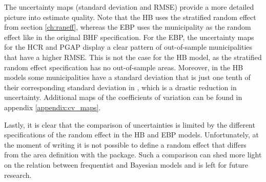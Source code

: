 The uncertainty maps (standard deviation and RMSE) provide a more detailed picture into estimate quality.
Note that the HB uses the stratified random effect from section \ref{ch:raneff}, whereas the EBP uses the municipality as the random effect like in the original BHF specification.
For the EBP, the uncertainty maps for the HCR and PGAP display a clear pattern of out-of-sample municipalities that have a higher RMSE.
This is not the case for the HB model, as the stratified random effect specification has no out-of-sample areas.
Moreover, in the HB models some municipalities have a standard deviation that is just one tenth of their corresponding standard deviation in \citep{morelli_hierarchical_2021}, which is a drastic reduction in uncertainty.
Additional maps of the coefficients of variation can be found in appendix \ref{appendix:cv_maps}.

Lastly, it is clear that the comparison of uncertainties is limited by the different specifications of the random effect in the HB and EBP models.
Unfortunately, at the moment of writing it is not possible to define a random effect that differs from the area definition with the  package.
Such a comparison can shed more light on the relation between frequentist and Bayesian models and is left for future research.

